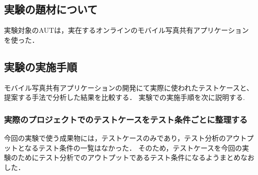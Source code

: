 \documentclass[a4paper,12pt]{jreport}
\begin{document}
\subsection{実験の題材について}
実験対象のAUTは，実在するオンラインのモバイル写真共有アプリケーションを使った．

\subsection{実験の実施手順}
モバイル写真共有アプリケーションの開発にて実際に使われたテストケースと、提案する手法で分析した結果を比較する．
実験での実施手順を次に説明する.
\subsubsection{実際のプロジェクトでのテストケースをテスト条件ごとに整理する}
今回の実験で使う成果物には，テストケースのみであり，テスト分析のアウトプットとなるテスト条件の一覧はなかった．
そのため，テストケースを今回の実験のためにテスト分析でのアウトプットであるテスト条件になるようまとめなおした．
\end{document}
